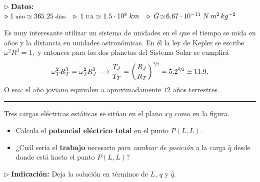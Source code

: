 \documentclass[a4paper,14pt]{exam}
\newcommand{\halmos}{
					\begin{flushright}
						\rule{1mm}{2.5mm} 
					\end{flushright}
					  }
\renewcommand{\qed}{\halmos}
\begin{document}
\begin{questions}
\begin{question}
	{
	\small \textbf{$\triangleright\;$Datos:} \hspace*{.5cm} $\triangleright\; 1\;\text{\footnotesize año}\simeq 365.25\;\text{\footnotesize días}\hspace{.3cm}
\triangleright\;1\;\text{\scriptsize UA}\simeq 1.5\cdot 10^8\;km\hspace{.3cm} \triangleright\;G\!\simeq\! 6.67\cdot 10^{-11}\;N\,m^2\,kg^{-2}$
	}	
	
	\begin{mdframed}[backgroundcolor=yellow!20]  
	Es muy interesante utilizar un sistema de unidades en el que el tiempo se mida en años y la distancia en unidades astronómicas. En él la ley de Kepler se escribe \(\omega^2R^3=1,\) y entonces
	para los dos planetas del Sistema Solar se cumplirá
	\[\omega^2_TR^3_T=\omega^2_JR^3_J\longrightarrow \frac{T_J}{T_T}=\left(\frac{R_J}{R_T}\right)^{\sfrac{3}{2}}=5.2^{\sfrac{3}{2}}\simeq 11.9.\]
	O sea: el año joviano equivalen a aproximadamente $12$ años terrestres.
	\end{mdframed}
	\end{question}
	\qed
	
	\newpage
	
	
	\begin{minipage}{.61\linewidth}
\begin{question}
 Tres cargas eléctricas estáticas se sitúan en el plano $xy$ como en la figura.  
\begin{itemize}
			\item[(a)] Calcula el \textbf{potencial eléctrico total} en el punto $P(L,L)$.
			\item[(b)] ¿Cuál sería el \textbf{trabajo} necesario \textit{para cambiar de posición} a la carga $\hat{q}$ desde donde está hasta el punto $P(L,L)$?

			
			\end{itemize}
\end{question}	
{\small \textbf{$\triangleright\;$Indicación:} Deja la solución en términos de $L$, $q$ y $\hat q$.}
		

\end{minipage}
\end{questions}
\end{document}
